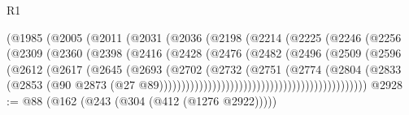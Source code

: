 \begin{lexlean}{R1}
\begin{coremodule}
                                (@1985
                                  (@2005
                                    (@2011
                                      (@2031
                                        (@2036
                                          (@2198
                                            (@2214
                                              (@2225
                                                (@2246
                                                  (@2256
                                                    (@2309
                                                      (@2360
                                                        (@2398
                                                          (@2416
                                                            (@2428
                                                              (@2476
                                                                (@2482
                                                                  (@2496
                                                                    (@2509
                                                                      (@2596
                                                                        (@2612
                                                                          (@2617
                                                                            (@2645
                                                                              (@2693
                                                                                (@2702
                                                                                  (@2732
                                                                                    (@2751
                                                                                      (@2774
                                                                                        (@2804
                                                                                          (@2833
                                                                                            (@2853
                                                                                              (@90
                                                                                                @2873
                                                                                                (@27
                                                                                                  @89)))))))))))))))))))))))))))))))))))))))))))))))
@2928 := @88 (@162 (@243 (@304 (@412 (@1276 @2922)))))

\end{coremodule}
\end{lexlean}
